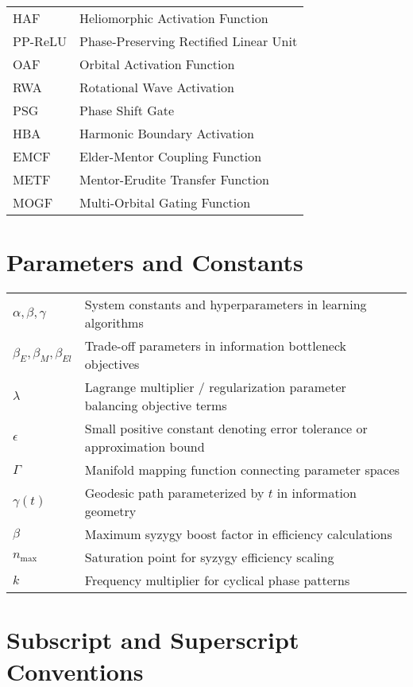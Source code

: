 \begin{tabular}{p{3cm} p{12cm}}
HAF & Heliomorphic Activation Function \\
PP-ReLU & Phase-Preserving Rectified Linear Unit \\
OAF & Orbital Activation Function \\
RWA & Rotational Wave Activation \\
PSG & Phase Shift Gate \\
HBA & Harmonic Boundary Activation \\
EMCF & Elder-Mentor Coupling Function \\
METF & Mentor-Erudite Transfer Function \\
MOGF & Multi-Orbital Gating Function \\
\end{tabular}

\newpage
\section*{Parameters and Constants}

\begin{tabular}{p{3cm} p{12cm}}
$\alpha, \beta, \gamma$ & System constants and hyperparameters in learning algorithms \\
$\beta_E, \beta_M, \beta_{El}$ & Trade-off parameters in information bottleneck objectives \\
$\lambda$ & Lagrange multiplier / regularization parameter balancing objective terms \\
$\epsilon$ & Small positive constant denoting error tolerance or approximation bound \\
$\Gamma$ & Manifold mapping function connecting parameter spaces \\
$\gamma(t)$ & Geodesic path parameterized by $t$ in information geometry \\
$\beta$ & Maximum syzygy boost factor in efficiency calculations \\
$n_{\text{max}}$ & Saturation point for syzygy efficiency scaling \\
$k$ & Frequency multiplier for cyclical phase patterns \\
\end{tabular}

\newpage
\section*{Subscript and Superscript Conventions}

